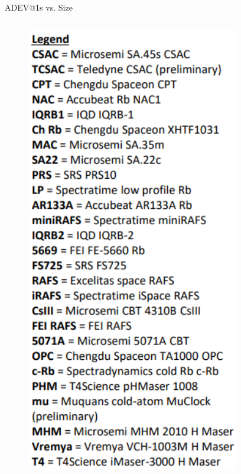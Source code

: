 \begin{frame}{ADEV@1s vs. Size}
\begin{columns}[c, onlytextwidth]
\begin{column}{0.3\textwidth}
            \begin{figure}
                \centering
                \includegraphics[width=0.83\textwidth]{img/legend.png}
            \end{figure}

        \end{column}

    \end{columns}


\end{frame}



